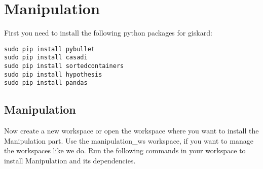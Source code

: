 \documentclass[main.tex]{subfiles}
\begin{document}
\section{Manipulation}
\label{sec:Manipulation}

First you need to install the following python packages for giskard:\\

\begin{lstlisting}
sudo pip install pybullet
sudo pip install casadi
sudo pip install sortedcontainers
sudo pip install hypothesis
sudo pip install pandas
\end{lstlisting}
	
	\subsection{Manipulation}
Now create a new workspace or open the workspace where you want to install the Manipulation part. Use the manipulation\_ws workspace, if you want to manage the workspaces like we do.
Run the following commands in your workspace to install Manipulation and its dependencies.\\	

\begin{mdframed}[backgroundcolor=mygray, rightline=false]

\end{mdframed}
	
	
\end{document}
